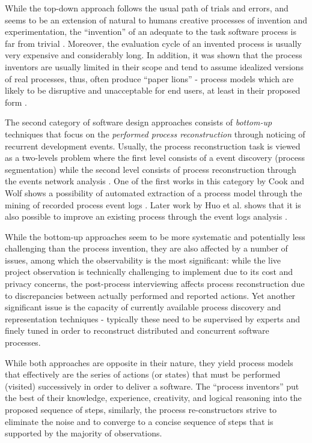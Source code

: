 While the top-down approach follows the usual path of trials and errors, and seems to be an 
extension of natural to humans creative processes of invention and experimentation, 
the ``invention'' of an adequate to the task software process is far from trivial 
\cite{citeulike:5043104} \cite{citeulike:1986013}. 
Moreover, the evaluation cycle of an invented process is usually very expensive and considerably long.
In addition, it was shown that the process inventors are usually limited in their scope and tend to 
assume idealized versions of real processes, thus, often produce ``paper lions'' - process models which are 
likely to be disruptive and unacceptable for end users, at least in their proposed form \cite{citeulike:9758924}.

The second category of software design approaches consists of \textit{bottom-up} techniques that focus 
on the \textit{performed process reconstruction} through noticing of recurrent development events. 
Usually, the process reconstruction task is viewed as a two-levels problem where the first level 
consists of a event discovery (process segmentation) while the second level consists of process 
reconstruction through the events network analysis \cite{citeulike:2703162}.
One of the first works in this category by Cook and Wolf shows a possibility of automated extraction 
of a process model through the mining of recorded process event logs 
\cite{citeulike:328044} \cite{citeulike:5120757} \cite{citeulike:5128143}. 
Later work by Huo et al. shows that it is also possible to improve an existing process
through the event logs analysis \cite{citeulike:7691059} \cite{citeulike:7690766}. 

While the bottom-up approaches seem to be more systematic and potentially less challenging 
than the process invention, 
they are also affected by a number of issues, among which the observability is the most significant: 
while the live project observation is technically challenging to implement due to its cost and 
privacy concerns, the post-process interviewing affects process reconstruction due to discrepancies 
between actually performed and reported actions. 
Yet another significant issue is the capacity of currently available process discovery and representation 
techniques - typically these need to be supervised by experts and finely tuned in order to reconstruct 
distributed and concurrent software processes. 

While both approaches are opposite in their nature, they yield process models that effectively are 
the series of actions (or states) that must be performed (visited) successively in order to deliver a 
software. The ``process inventors'' put the best of their knowledge, experience, creativity, and logical 
reasoning into the proposed sequence of steps, similarly, the process re-constructors 
strive to eliminate the noise and to converge to a concise sequence of steps that is supported by the 
majority of observations. 

